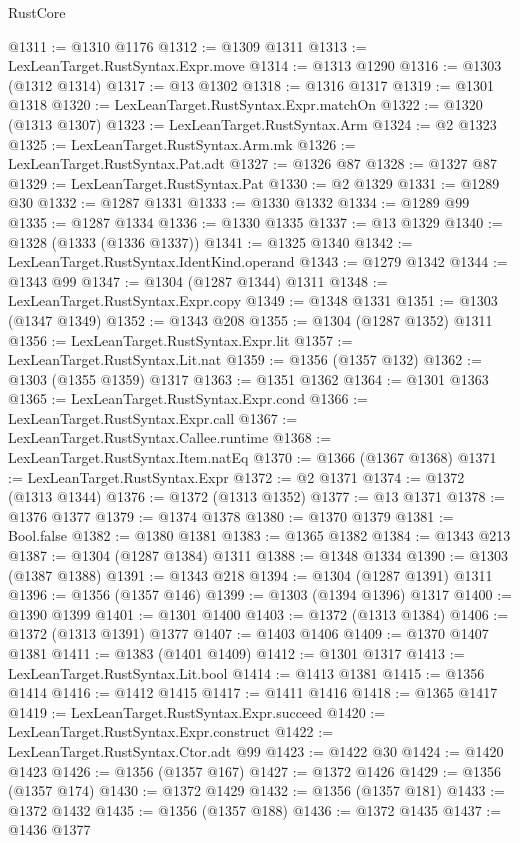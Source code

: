 \begin{lexlean}{RustCore}
\begin{coremodule}
@1311 := @1310 @1176
@1312 := @1309 @1311
@1313 := LexLeanTarget.RustSyntax.Expr.move
@1314 := @1313 @1290
@1316 := @1303 (@1312 @1314)
@1317 := @13 @1302
@1318 := @1316 @1317
@1319 := @1301 @1318
@1320 := LexLeanTarget.RustSyntax.Expr.matchOn
@1322 := @1320 (@1313 @1307)
@1323 := LexLeanTarget.RustSyntax.Arm
@1324 := @2 @1323
@1325 := LexLeanTarget.RustSyntax.Arm.mk
@1326 := LexLeanTarget.RustSyntax.Pat.adt
@1327 := @1326 @87
@1328 := @1327 @87
@1329 := LexLeanTarget.RustSyntax.Pat
@1330 := @2 @1329
@1331 := @1289 @30
@1332 := @1287 @1331
@1333 := @1330 @1332
@1334 := @1289 @99
@1335 := @1287 @1334
@1336 := @1330 @1335
@1337 := @13 @1329
@1340 := @1328 (@1333 (@1336 @1337))
@1341 := @1325 @1340
@1342 := LexLeanTarget.RustSyntax.IdentKind.operand
@1343 := @1279 @1342
@1344 := @1343 @99
@1347 := @1304 (@1287 @1344) @1311
@1348 := LexLeanTarget.RustSyntax.Expr.copy
@1349 := @1348 @1331
@1351 := @1303 (@1347 @1349)
@1352 := @1343 @208
@1355 := @1304 (@1287 @1352) @1311
@1356 := LexLeanTarget.RustSyntax.Expr.lit
@1357 := LexLeanTarget.RustSyntax.Lit.nat
@1359 := @1356 (@1357 @132)
@1362 := @1303 (@1355 @1359) @1317
@1363 := @1351 @1362
@1364 := @1301 @1363
@1365 := LexLeanTarget.RustSyntax.Expr.cond
@1366 := LexLeanTarget.RustSyntax.Expr.call
@1367 := LexLeanTarget.RustSyntax.Callee.runtime
@1368 := LexLeanTarget.RustSyntax.Item.natEq
@1370 := @1366 (@1367 @1368)
@1371 := LexLeanTarget.RustSyntax.Expr
@1372 := @2 @1371
@1374 := @1372 (@1313 @1344)
@1376 := @1372 (@1313 @1352)
@1377 := @13 @1371
@1378 := @1376 @1377
@1379 := @1374 @1378
@1380 := @1370 @1379
@1381 := Bool.false
@1382 := @1380 @1381
@1383 := @1365 @1382
@1384 := @1343 @213
@1387 := @1304 (@1287 @1384) @1311
@1388 := @1348 @1334
@1390 := @1303 (@1387 @1388)
@1391 := @1343 @218
@1394 := @1304 (@1287 @1391) @1311
@1396 := @1356 (@1357 @146)
@1399 := @1303 (@1394 @1396) @1317
@1400 := @1390 @1399
@1401 := @1301 @1400
@1403 := @1372 (@1313 @1384)
@1406 := @1372 (@1313 @1391) @1377
@1407 := @1403 @1406
@1409 := @1370 @1407 @1381
@1411 := @1383 (@1401 @1409)
@1412 := @1301 @1317
@1413 := LexLeanTarget.RustSyntax.Lit.bool
@1414 := @1413 @1381
@1415 := @1356 @1414
@1416 := @1412 @1415
@1417 := @1411 @1416
@1418 := @1365 @1417
@1419 := LexLeanTarget.RustSyntax.Expr.succeed
@1420 := LexLeanTarget.RustSyntax.Expr.construct
@1422 := LexLeanTarget.RustSyntax.Ctor.adt @99
@1423 := @1422 @30
@1424 := @1420 @1423
@1426 := @1356 (@1357 @167)
@1427 := @1372 @1426
@1429 := @1356 (@1357 @174)
@1430 := @1372 @1429
@1432 := @1356 (@1357 @181)
@1433 := @1372 @1432
@1435 := @1356 (@1357 @188)
@1436 := @1372 @1435
@1437 := @1436 @1377

\end{coremodule}
\end{lexlean}
